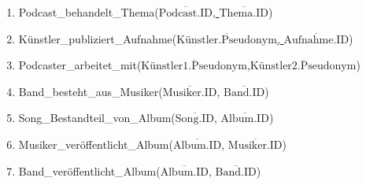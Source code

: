 \documentclass[a4paper,11pt]{article}
\begin{document}
\begin{enumerate}
   
    \item Podcast\_behandelt\_Thema(\underline{$\overline{\text{Podcast.ID}}$, $\overline{\text{Thema.ID}}$})
    \item Künstler\_publiziert\_Aufnahme(\underline{$\overline{\text{Künstler.Pseudonym}}$, $\overline{\text{Aufnahme.ID}}$})
    \item Podcaster\_arbeitet\_mit(\underline{$\overline{\text{Künstler1.Pseudonym}}$,$\overline{\text{Künstler2.Pseudonym}}$})
    \item Band\_besteht\_aus\_Musiker(\underline{$\overline{\text{Musiker.ID}}$}, $\overline{\text{Band.ID}}$) 
    \item Song\_Bestandteil\_von\_Album(\underline{$\overline{\text{Song.ID}}$}, $\overline{\text{Album.ID}}$)

    \item Musiker\_veröffentlicht\_Album(\underline{$\overline{\text{Album.ID}}$}, $\overline{\text{Musiker.ID}}$)
    \item Band\_veröffentlicht\_Album(\underline{$\overline{\text{Album.ID}}$}, $\overline{\text{Band.ID}}$)
\end{enumerate}
\end{document}
